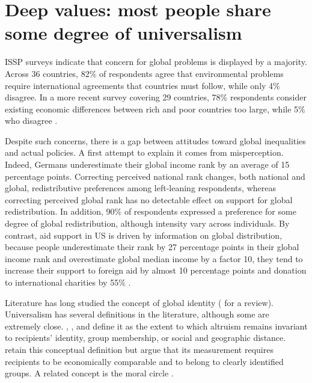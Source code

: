 \documentclass[11pt,a4paper]{article}
\begin{document}
\section*{Deep values: most people share some degree of universalism}





ISSP surveys indicate that concern for global problems is displayed by a majority. Across 36 countries, 82\% of respondents agree that environmental problems require international agreements that countries must follow, while only 4\% disagree. In a more recent survey covering 29 countries, 78\% respondents consider existing economic differences between rich and poor countries too large, while 5\% who disagree \citep{issp_environment_2010,issp_inequality_2019}. 

Despite such concerns, there is a gap between attitudes toward global inequalities and actual policies. A first attempt to explain it comes from misperception. Indeed, Germans underestimate their global income rank by an average of 15 percentage points. Correcting perceived national rank changes, both national and global, redistributive preferences among left-leaning respondents, whereas correcting perceived global rank has no detectable effect on support for global redistribution. In addition, 90\% of respondents expressed a preference for some degree of global redistribution, although intensity vary across individuals.
By contrast, aid support in US is driven by information on global distribution, because people underestimate their rank by 27 percentage points in their global income rank and overestimate global median income by a factor 10, they tend to increase their support to foreign aid by almost 10 percentage points and donation to international charities by 55\% \citep{nair_misperceptions_2018}.


Literature has long studied the concept of global identity (\citet{rey_2018} for a review). Universalism has several definitions in the literature, although some are extremely close. \citet{enke_moral_2023}, \citet{enke_universalism_2024}, and \citet{cappelen_universalism_2025} define it as the extent to which altruism remains invariant to recipients' identity, group membership, or social and geographic distance. \citet{boyer-kassem_how_2026} retain this conceptual definition but argue that its measurement requires recipients to be economically comparable and to belong to clearly identified groups. A related concept is the moral circle \citep{waytz_ideological_2019,jaeger_toward_2026}.
\end{document}

